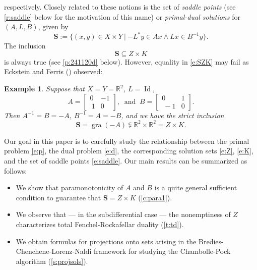\documentclass{article}
\newcommand{\menge}[2]{\big\{{#1}~\big |~{#2}\big\}}
\newcommand{\RR}{\ensuremath{\mathbb R}}
\newcommand{\Id}{\ensuremath{\operatorname{Id}}}
\newcommand{\bS}{\ensuremath{{\mathbf{S}}}}
\newcommand{\bKT}{\ensuremath{{\mathbf{S}}}}
\newtheorem{example}[theorem]{Example}
\providecommand{\gra}{\operatorname{gra}}
\begin{document}
respectively. 
Closely related to these notions is the set of 
\emph{saddle points} 
{
(see \cref{r:saddle} below for the motivation of this name) 
or \emph{primal-dual solutions} 
} 
for $(A,L,B)$, given by 
\begin{equation}
\label{e:saddle}
\bKT := \menge{(x,y)\in X\times Y}{-L^*y\in Ax\land Lx\in B^{-1}y}. 
\end{equation}
The inclusion 
\begin{equation}
\label{e:SZK}
\bKT \subseteq Z\times K
\end{equation}
is always true  (see \cref{p:241120d} below). 
However, equality in \cref{e:SZK} may fail as 
Eckstein and Ferris (\cite[page~69]{EF}) observed: 

\begin{example}
\label{ex:skewbad}
Suppose that $X=Y=\RR^2$, $L=\Id$,
\begin{equation}
A = \begin{bmatrix} 
0 & -1 \\\
1 & 0 
\end{bmatrix},
\;\;\text{and}\;\;
B = \begin{bmatrix} 
0 & 1 \\\
-1 & 0 
\end{bmatrix}.
\end{equation}
Then $A^{-1}=B=-A$, $B^{-1}=A=-B$, and
we have the strict inclusion 
\begin{equation}
\bKT = \gra(-A) 
\subsetneqq \RR^2\times\RR^2 = Z\times K.
\end{equation}
\end{example}


Our goal in this paper is to carefully study the relationship 
between the primal problem \cref{e:p}, the dual problem \cref{e:d}, 
the corresponding solution sets \cref{e:Z}, \cref{e:K}, and the
set of saddle points \cref{e:saddle}. 
Our main results can be summarized as follows:

\begin{itemize}
\item We show that paramonotonicity of $A$ and $B$ is a quite general sufficient condition to guarantee that $\bS = Z\times K$ (\cref{c:para1}). 
\item We observe that --- in the subdifferential case --- the nonemptiness of $Z$
characterizes total Fenchel-Rockafellar duality (\cref{t:td}). 
\item We obtain formulas for projections onto sets arising in the 
Bredies-Chenchene-Lorenz-Naldi framework for studying the 
Chambolle-Pock algorithm (\cref{s:projsols}). 
\end{itemize}
\end{document}
